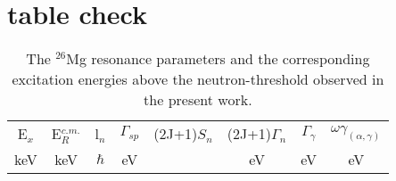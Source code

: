
%
%


\chapter{table check}

\begin{landscape}
\setlength{\capwidth}{0.7\textwidth}

    \begin{table}[tpb]
        \begin{centering}
        \caption{ The $^{26}$Mg resonance parameters and the corresponding excitation energies above the neutron-threshold observed in the present work. }
        \label{tb:reaction_parameters}  
    \begin{tabular}{c c c c c c c c }
    \toprule
    \toprule
    E$_x$   &       E$_R^{c.m.}$&   l$_n$    &   $\Gamma_{sp}$   &   (2J+1)$S_n$ &  (2J+1)$\Gamma_n$    &  $\Gamma_\gamma$ & $\omega\gamma_{(\alpha,\gamma)}$    \\
    keV     &       keV         &   $\hbar$  &   eV              &               &  eV                  &   eV        &          eV       \\
 \hline


        \hline
     \end{tabular}
      \end{centering}
    \end{table}

\end{landscape}





